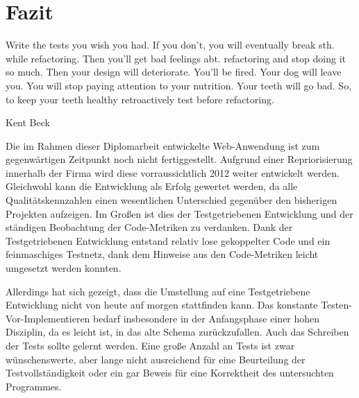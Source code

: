 \chapter{Fazit}
\label{sec:fazit}
\epigraph{Write the tests you wish you had. If you don’t, you will eventually break sth. while refactoring. Then you’ll get bad feelings abt. refactoring and stop doing it so much. Then your design will deteriorate. You’ll be fired. Your dog will leave you. You will stop paying attention to your nutrition. Your teeth will go bad. So, to keep your teeth healthy retroactively test before refactoring.}{Kent Beck \citep{beck_test_2002}}

Die im Rahmen dieser Diplomarbeit entwickelte Web-Anwendung ist zum gegenwärtigen Zeitpunkt noch nicht fertiggestellt. Aufgrund einer Repriorisierung innerhalb der Firma wird diese vorraussichtlich 2012 weiter entwickelt werden. Gleichwohl kann die Entwicklung als Erfolg gewertet werden, da alle Qualitätskennzahlen einen wesentlichen Unterschied gegenüber den bisherigen Projekten aufzeigen. Im Großen ist dies der Testgetriebenen Entwicklung und der ständigen Beobachtung der Code-Metriken zu verdanken. Dank der Testgetriebenen Entwicklung entstand relativ lose gekoppelter Code und ein feinmaschiges Testnetz, dank dem Hinweise aus den Code-Metriken leicht umgesetzt werden konnten.

Allerdings hat sich gezeigt, dass die Umstellung auf eine Testgetriebene Entwicklung nicht von heute auf morgen stattfinden kann. Das konstante Testen-Vor\hyp{}Implementieren bedarf insbesondere in der Anfangsphase einer hohen Disziplin, da es leicht ist, in das alte Schema zurückzufallen. Auch das Schreiben der Tests sollte gelernt werden. Eine große Anzahl an Tests ist zwar wünschenswerte, aber lange nicht ausreichend für eine Beurteilung der Testvollständigkeit oder ein gar Beweis für eine Korrektheit des untersuchten Programmes.

